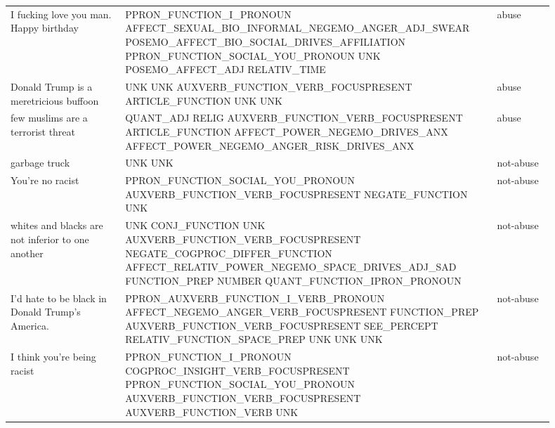 \begin{longtable}[c]{p{0.2\linewidth} p{0.6\linewidth} p{0.1\linewidth}}
I fucking love you man. Happy birthday                & PPRON\_FUNCTION\_I\_PRONOUN AFFECT\_SEXUAL\_BIO\_INFORMAL\_NEGEMO\_ANGER\_ADJ\_SWEAR POSEMO\_AFFECT\_BIO\_SOCIAL\_DRIVES\_AFFILIATION PPRON\_FUNCTION\_SOCIAL\_YOU\_PRONOUN UNK POSEMO\_AFFECT\_ADJ RELATIV\_TIME                      & abuse      \\
Donald Trump is a meretricious buffoon                & UNK UNK AUXVERB\_FUNCTION\_VERB\_FOCUSPRESENT ARTICLE\_FUNCTION UNK UNK                                                                                                                                              & abuse      \\
few muslims are a terrorist threat                    & QUANT\_ADJ RELIG AUXVERB\_FUNCTION\_VERB\_FOCUSPRESENT ARTICLE\_FUNCTION AFFECT\_POWER\_NEGEMO\_DRIVES\_ANX AFFECT\_POWER\_NEGEMO\_ANGER\_RISK\_DRIVES\_ANX                                                                     & abuse      \\
garbage truck                                         & UNK UNK                                                                                                                                                                                                          & not-abuse  \\
You're no racist                                      & PPRON\_FUNCTION\_SOCIAL\_YOU\_PRONOUN AUXVERB\_FUNCTION\_VERB\_FOCUSPRESENT NEGATE\_FUNCTION UNK                                                                                                                         & not-abuse  \\
whites and blacks are not inferior to one another     & UNK CONJ\_FUNCTION UNK AUXVERB\_FUNCTION\_VERB\_FOCUSPRESENT NEGATE\_COGPROC\_DIFFER\_FUNCTION AFFECT\_RELATIV\_POWER\_NEGEMO\_SPACE\_DRIVES\_ADJ\_SAD FUNCTION\_PREP NUMBER QUANT\_FUNCTION\_IPRON\_PRONOUN                       & not-abuse  \\
I'd hate to be black in Donald Trump's America.       & PPRON\_AUXVERB\_FUNCTION\_I\_VERB\_PRONOUN AFFECT\_NEGEMO\_ANGER\_VERB\_FOCUSPRESENT FUNCTION\_PREP AUXVERB\_FUNCTION\_VERB\_FOCUSPRESENT SEE\_PERCEPT RELATIV\_FUNCTION\_SPACE\_PREP UNK UNK UNK                                 & not-abuse  \\
I think you're being racist                           & PPRON\_FUNCTION\_I\_PRONOUN COGPROC\_INSIGHT\_VERB\_FOCUSPRESENT PPRON\_FUNCTION\_SOCIAL\_YOU\_PRONOUN AUXVERB\_FUNCTION\_VERB\_FOCUSPRESENT AUXVERB\_FUNCTION\_VERB UNK                                                        & not-abuse  \\

\end{longtable}
